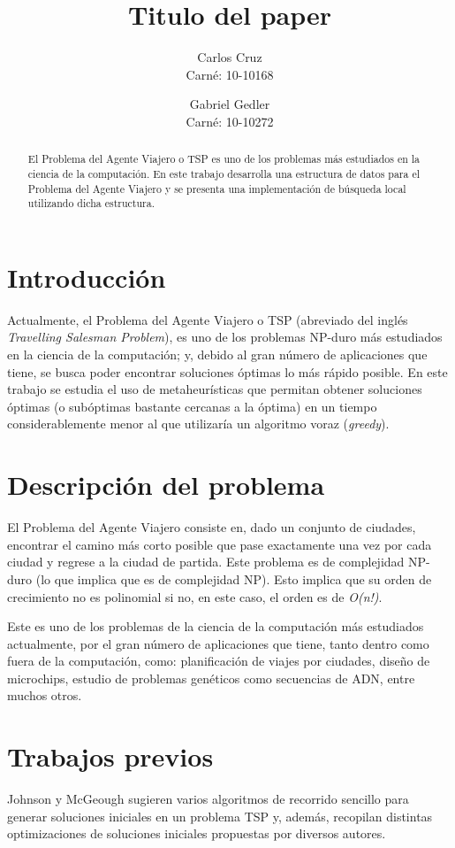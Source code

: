 \documentclass{ci5652}
\title{Titulo del paper}
\author{Carlos Cruz\\
Carné: 10-10168
        \and
        Gabriel Gedler\\
Carné: 10-10272}
\begin{document}
\thispagestyle{empty}
\maketitle


\begin{abstract}
El Problema del Agente Viajero o TSP es uno de los problemas más estudiados en la ciencia de la computación. En este trabajo desarrolla una estructura de datos para el Problema del Agente Viajero y se presenta una implementación de búsqueda local utilizando dicha estructura.
\end{abstract}

\section{Introducción}
Actualmente, el Problema del Agente Viajero o TSP (abreviado del inglés \textit{Travelling Salesman Problem}), es uno de los problemas NP-duro más estudiados en la ciencia de la computación; y, debido al gran número de aplicaciones que tiene, se busca poder encontrar soluciones óptimas lo más rápido posible. 
En este trabajo se estudia el uso de metaheurísticas que permitan obtener soluciones óptimas (o subóptimas bastante cercanas a la óptima) en un tiempo considerablemente menor al que utilizaría un algoritmo voraz (\textit{greedy}).

\section{Descripción del problema}
El Problema del Agente Viajero consiste en, dado un conjunto de ciudades, encontrar el camino más corto posible que pase exactamente una vez por cada ciudad y regrese a la ciudad de partida. Este problema es de complejidad NP-duro (lo que implica que es de complejidad NP). Esto implica que su orden de crecimiento no es polinomial si no, en este caso, el orden es de \textit{O(n!)}.

Este es uno de los problemas de la ciencia de la computación más estudiados actualmente, por el gran número de aplicaciones que tiene, tanto dentro como fuera de la computación, como: planificación de viajes por ciudades, diseño de microchips, estudio de problemas genéticos como secuencias de ADN, entre muchos otros.


\section{Trabajos previos}
Johnson y McGeough\cite{jm1995} sugieren varios algoritmos de recorrido sencillo para generar soluciones iniciales en un problema TSP y, además, recopilan distintas optimizaciones de soluciones iniciales propuestas por diversos autores.
\end{document}
